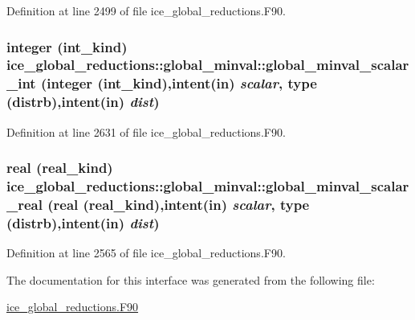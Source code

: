 Definition at line 2499 of file ice\_\-global\_\-reductions.F90.\hypertarget{interfaceice__global__reductions_1_1global__minval_a52c1c23cf1e9e7a47884afbbe5e6f4f0}{
\subsubsection[{global\_\-minval\_\-scalar\_\-int}]{\setlength{\rightskip}{0pt plus 5cm}integer (int\_\-kind) ice\_\-global\_\-reductions::global\_\-minval::global\_\-minval\_\-scalar\_\-int (integer (int\_\-kind),intent(in) {\em scalar}, \/  type ({\bf distrb}),intent(in) {\em dist})}}
\label{interfaceice__global__reductions_1_1global__minval_a52c1c23cf1e9e7a47884afbbe5e6f4f0}


Definition at line 2631 of file ice\_\-global\_\-reductions.F90.\hypertarget{interfaceice__global__reductions_1_1global__minval_acb47ea72fe685904a9b7b632eca96184}{
\subsubsection[{global\_\-minval\_\-scalar\_\-real}]{\setlength{\rightskip}{0pt plus 5cm}real (real\_\-kind) ice\_\-global\_\-reductions::global\_\-minval::global\_\-minval\_\-scalar\_\-real (real (real\_\-kind),intent(in) {\em scalar}, \/  type ({\bf distrb}),intent(in) {\em dist})}}
\label{interfaceice__global__reductions_1_1global__minval_acb47ea72fe685904a9b7b632eca96184}


Definition at line 2565 of file ice\_\-global\_\-reductions.F90.

The documentation for this interface was generated from the following file:\begin{DoxyCompactItemize}
\item 
\hyperlink{ice__global__reductions_8F90}{ice\_\-global\_\-reductions.F90}\end{DoxyCompactItemize}
